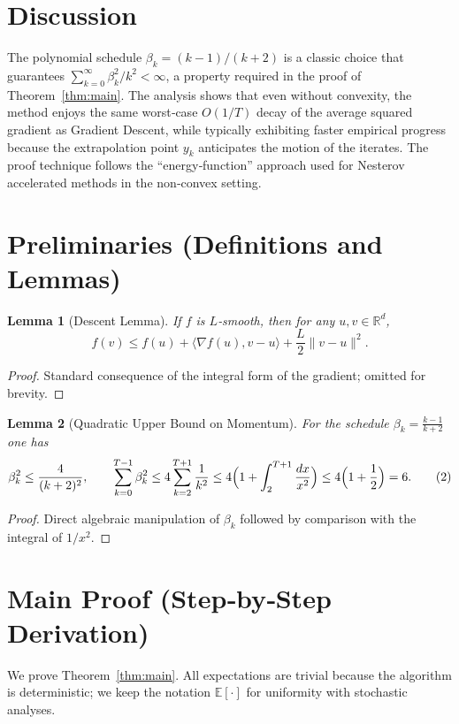 \documentclass{article}
\newtheorem{lemma}{Lemma}
\newcommand{\E}{\mathbb{E}}
\newcommand{\R}{\mathbb{R}}
\begin{document}
\section*{Discussion}
The polynomial schedule $\beta_k=(k-1)/(k+2)$ is a classic choice that
guarantees $\sum_{k=0}^{\infty}\beta_k^2/k^2<\infty$, a property required in the
proof of Theorem~\ref{thm:main}.  The analysis shows that even without convexity,
the method enjoys the same worst‑case $O(1/T)$ decay of the average squared gradient
as Gradient Descent, while typically exhibiting faster empirical progress
because the extrapolation point $y_k$ anticipates the motion of the iterates.
The proof technique follows the “energy‑function” approach used for Nesterov
accelerated methods in the non‑convex setting.

\section*{Preliminaries (Definitions and Lemmas)}
\begin{lemma}[Descent Lemma]\label{lem:descent}
If $f$ is $L$‑smooth, then for any $u,v\in\R^d$,
\[
f(v)\le f(u)+\langle\nabla f(u),v-u\rangle+\frac{L}{2}\|v-u\|^2 .
\]
\end{lemma}
\begin{proof}
Standard consequence of the integral form of the gradient; omitted for brevity.
\end{proof}

\begin{lemma}[Quadratic Upper Bound on Momentum]\label{lem:mom}
For the schedule $\beta_k=\frac{k-1}{k+2}$ one has
\[
\beta_k^2 \le \frac{4}{(k+2)^2},\qquad
\sum_{k=0}^{T-1}\beta_k^2 \le 4\sum_{k=2}^{T+1}\frac{1}{k^2}
\le 4\Bigl(1+\int_{2}^{T+1}\frac{dx}{x^2}\Bigr)
\le 4\Bigl(1+\frac{1}{2}\Bigr)=6 .
\tag{2}
\]
\end{lemma}
\begin{proof}
Direct algebraic manipulation of $\beta_k$ followed by comparison with the
integral of $1/x^2$.
\end{proof}

\section*{Main Proof (Step‑by‑Step Derivation)}
We prove Theorem~\ref{thm:main}.  All expectations are trivial because the
algorithm is deterministic; we keep the notation $\E[\cdot]$ for uniformity
with stochastic analyses.
\end{document}
